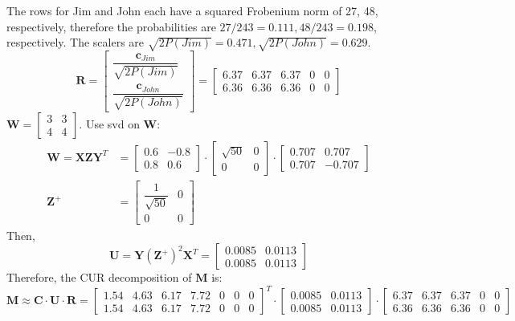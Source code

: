 \documentclass[11pt]{article}
\newcommand{\bM}{ \bm{M} }
\newcommand{\bC}{ \bm{C} }
\newcommand{\bc}{ \bm{c} }
\newcommand{\bU}{ \bm{U} }
\newcommand{\bR}{ \bm{R} }
\newcommand{\bW}{ \bm{W} }
\newcommand{\bX}{ \bm{X} }
\newcommand{\bY}{ \bm{Y} }
\newcommand{\bZ}{ \bm{Z} }
\begin{document}
\begin{enumerate}[(a)]
  The rows for Jim and John each have a squared Frobenium norm of 27, 48,
  respectively, therefore the probabilities are $27/243 = 0.111, 48/243=0.198$,
  respectively. The scalers are $\sqrt{2P(Jim)} = 0.471, \sqrt{2P(John)} =
  0.629$.
  \[
    \bR =
    \begin{bmatrix}
      \dfrac{\bc_{Jim}}{\sqrt{2P(Jim)}} \\
      \dfrac{\bc_{John}}{\sqrt{2P(John)}}
    \end{bmatrix}
    =
    \begin{bmatrix}
      6.37 & 6.37 & 6.37 & 0 & 0 \\
      6.36 & 6.36 & 6.36 & 0 & 0 
    \end{bmatrix}
  \]
  $\bW =
  \begin{bmatrix}
    3 & 3 \\
    4 & 4
  \end{bmatrix}$. Use svd on $\bW$:
  \begin{align*}
    \bW = \bX\bZ\bY^T &=
    \begin{bmatrix}
      0.6 & {-0.8}\\
      0.8 & 0.6
    \end{bmatrix}
    \cdot
    \begin{bmatrix}
      \sqrt{50} & 0 \\
      0 & 0
    \end{bmatrix}
    \cdot
    \begin{bmatrix}
      0.707 & 0.707 \\
      0.707 & {-0.707}
    \end{bmatrix} \\
    \bZ^+ &= \begin{bmatrix}
      \dfrac{1}{\sqrt{50}} & 0 \\
      0 & 0
    \end{bmatrix}
  \end{align*}
  Then,
  \[
    \bU = \bY (\bZ^+)^2\bX^T =
    \begin{bmatrix}
      0.0085 & 0.0113 \\
      0.0085 & 0.0113 
    \end{bmatrix}
  \]
  Therefore, the CUR decomposition of $\bM$ is:
  \[
    \bM \approx \bC \cdot \bU \cdot \bR
    = \begin{bmatrix}
      1.54 & 4.63 & 6.17 & 7.72 & 0 & 0 & 0 \\
      1.54 & 4.63 & 6.17 & 7.72 & 0 & 0 & 0
    \end{bmatrix}^T \cdot
    \begin{bmatrix}
      0.0085 & 0.0113 \\
      0.0085 & 0.0113 
    \end{bmatrix} \cdot
    \begin{bmatrix}
      6.37 & 6.37 & 6.37 & 0 & 0 \\
      6.36 & 6.36 & 6.36 & 0 & 0 
    \end{bmatrix}
    \]
\end{enumerate}
\end{document}
